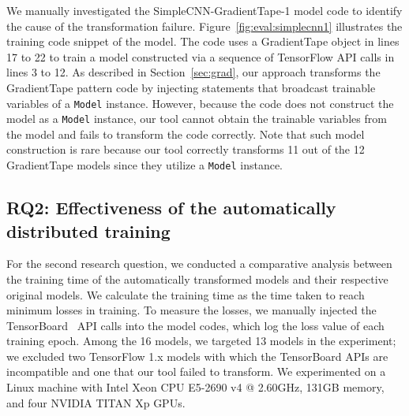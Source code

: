 We manually investigated the SimpleCNN-GradientTape-1 model code to 
identify the cause of the transformation failure.
Figure~\ref{fig:eval:simplecnn1} illustrates the training code snippet of the
model.
The code uses a GradientTape object in lines 17 to 22 to train a model
constructed via a sequence of TensorFlow API calls in lines 3 to 12.
As described in Section~\ref{sec:grad}, our approach transforms the
GradientTape pattern code by injecting statements that broadcast trainable
variables of a {\tt Model} instance.
However, because the code does not construct the model as a {\tt Model}
instance, our tool cannot obtain the trainable variables from the model and
fails to transform the code correctly.
Note that such model construction is rare because our tool correctly transforms
11 out of the 12 GradientTape models since they utilize a {\tt Model}
instance.


\subsection{RQ2: Effectiveness of the automatically distributed training}
For the second research question, we conducted a comparative analysis
between the training time of the automatically transformed models and their
respective original models.
We calculate the training time as the time taken to reach minimum losses in
training.
To measure the losses, we manually injected the TensorBoard~\cite{tensorboard}
API calls into the model codes, which log the loss value of each training
epoch.
Among the 16 models, we targeted 13 models in the experiment; we excluded two
TensorFlow 1.x models with which the TensorBoard APIs are incompatible 
and one that our tool failed to transform.
We experimented on a Linux machine with Intel Xeon CPU E5-2690 v4 @
2.60GHz, 131GB memory, and four NVIDIA TITAN Xp GPUs.




